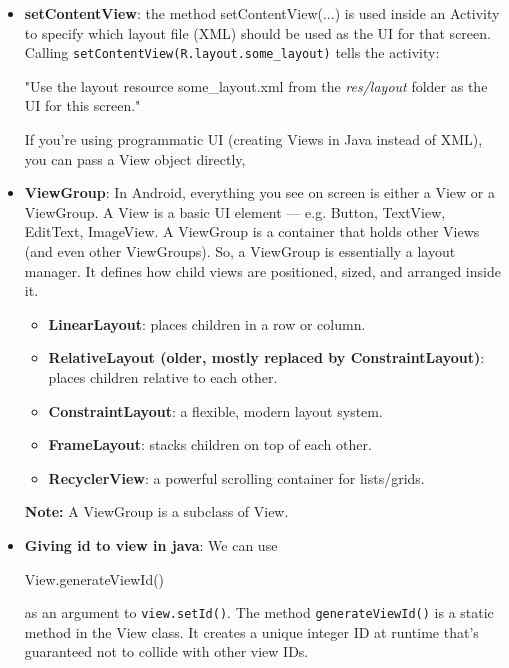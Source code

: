 \documentclass{report}
\begin{document}
\begin{itemize}
\begin{javacode}
            \end{javacode}
        \item \textbf{setContentView}: the method setContentView(...) is used inside an Activity to specify which layout file (XML) should be used as the UI for that screen.
            \bigbreak \noindent 
            Calling \texttt{setContentView(R.layout.some\_layout)} tells the activity:
            \begin{center}
                "Use the layout resource some\_layout.xml from the \textit{res/layout} folder as the UI for this screen."
            \end{center}
            \bigbreak \noindent 
            If you’re using programmatic UI (creating Views in Java instead of XML), you can pass a View object directly,
        \item \textbf{ViewGroup}:
            In Android, everything you see on screen is either a View or a ViewGroup.
            \bigbreak \noindent 
            A View is a basic UI element — e.g. Button, TextView, EditText, ImageView.
            \bigbreak \noindent 
            A ViewGroup is a container that holds other Views (and even other ViewGroups). 
            \bigbreak \noindent 
            So, a ViewGroup is essentially a layout manager. It defines how child views are positioned, sized, and arranged inside it.
            \begin{itemize}
                \item \textbf{LinearLayout}: places children in a row or column.
                \item \textbf{RelativeLayout (older, mostly replaced by ConstraintLayout)}: places children relative to each other.
                \item \textbf{ConstraintLayout}: a flexible, modern layout system.
                \item \textbf{FrameLayout}: stacks children on top of each other.
                \item \textbf{RecyclerView}: a powerful scrolling container for lists/grids.
            \end{itemize}
            \textbf{Note:} A ViewGroup is a subclass of View.
        \item \textbf{Giving id to view in java}: We can use
            \bigbreak \noindent 
            \begin{javacode}
            View.generateViewId()
            \end{javacode}
            as an argument to \texttt{view.setId()}. The method \texttt{generateViewId()} is a static method in the View class. It creates a unique integer ID at runtime that’s guaranteed not to collide with other view IDs.

\end{itemize}
\end{document}
